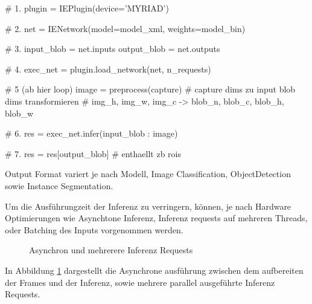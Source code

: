 %     
\begin{minipage}{0.3\textwidth}
    \centering
    
    \label{}
\end{minipage}
\begin{minipage}{0.7\textwidth}

    \begin{python}

        # 1. 
      plugin = IEPlugin(device='MYRIAD')
    
       # 2.
        net = IENetwork(model=model_xml, weights=model_bin)
    
        # 3. 
        input_blob  = net.inputs
        output_blob = net.outputs
    
        # 4.
        exec_net = plugin.load_network(net, n_requests)
    
        # 5 (ab hier loop)
        image = preprocess(capture) 
        # capture dims zu input blob dims transformieren
        # img_h, img_w, img_c -> blob_n, blob_c, blob_h, blob_w
    
            # 6. 
        res = exec_net.infer({input_blob : image})
    
        # 7.
        res = res[output_blob] # enthaellt zb rois
    
        
    \end{python}
    

\end{minipage}





Output Format variert je nach Modell, Image Classification,
ObjectDetection sowie Instance Segmentation.


Um die Ausführungzeit der Inferenz zu verringern, können, 
je nach Hardware Optimierungen wie Asynchtone Inferenz, 
Inferenz requests auf mehreren Threads, oder Batching des 
Inputs vorgenommen werden.

\begin{figure}[htb]
    \centering
    \def\svgwidth{0.7\textwidth}
    
    \caption{Asynchron und mehrerere Inferenz Requests}
    \label{fig:async}
\end{figure}

In Abbildung \ref{fig:async} dargestellt die Asynchrone ausführung 
zwischen dem aufbereiten der Frames und der Inferenz, sowie 
mehrere parallel ausgeführte Inferenz Requests.

